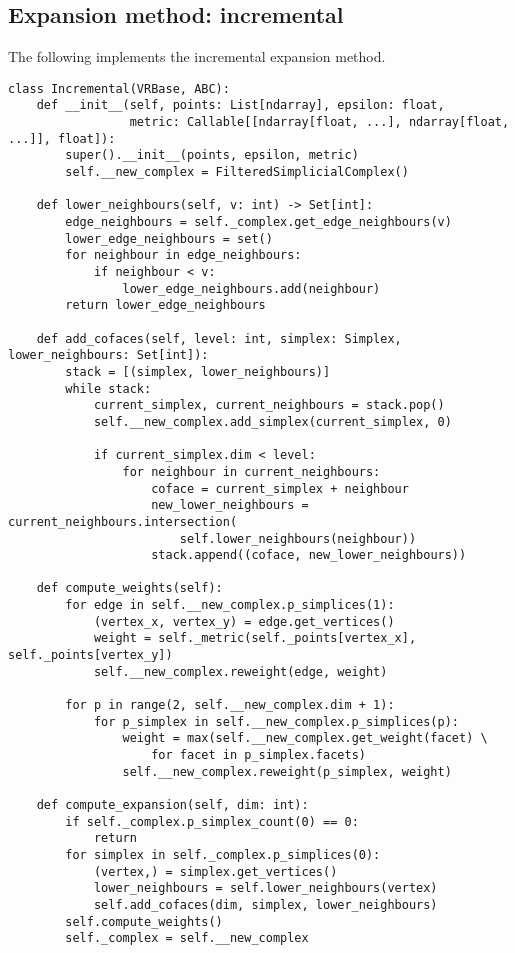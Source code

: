 \subsection{Expansion method: incremental}

The following implements the incremental expansion method.

\begin{verbatim}
class Incremental(VRBase, ABC):
    def __init__(self, points: List[ndarray], epsilon: float,
                 metric: Callable[[ndarray[float, ...], ndarray[float, ...]], float]):
        super().__init__(points, epsilon, metric)
        self.__new_complex = FilteredSimplicialComplex()

    def lower_neighbours(self, v: int) -> Set[int]:
        edge_neighbours = self._complex.get_edge_neighbours(v)
        lower_edge_neighbours = set()
        for neighbour in edge_neighbours:
            if neighbour < v:
                lower_edge_neighbours.add(neighbour)
        return lower_edge_neighbours

    def add_cofaces(self, level: int, simplex: Simplex, lower_neighbours: Set[int]):
        stack = [(simplex, lower_neighbours)]
        while stack:
            current_simplex, current_neighbours = stack.pop()
            self.__new_complex.add_simplex(current_simplex, 0)

            if current_simplex.dim < level:
                for neighbour in current_neighbours:
                    coface = current_simplex + neighbour
                    new_lower_neighbours = current_neighbours.intersection(
                        self.lower_neighbours(neighbour))
                    stack.append((coface, new_lower_neighbours))

    def compute_weights(self):
        for edge in self.__new_complex.p_simplices(1):
            (vertex_x, vertex_y) = edge.get_vertices()
            weight = self._metric(self._points[vertex_x], self._points[vertex_y])
            self.__new_complex.reweight(edge, weight)

        for p in range(2, self.__new_complex.dim + 1):
            for p_simplex in self.__new_complex.p_simplices(p):
                weight = max(self.__new_complex.get_weight(facet) \
                    for facet in p_simplex.facets)
                self.__new_complex.reweight(p_simplex, weight)

    def compute_expansion(self, dim: int):
        if self._complex.p_simplex_count(0) == 0:
            return
        for simplex in self._complex.p_simplices(0):
            (vertex,) = simplex.get_vertices()
            lower_neighbours = self.lower_neighbours(vertex)
            self.add_cofaces(dim, simplex, lower_neighbours)
        self.compute_weights()
        self._complex = self.__new_complex
\end{verbatim}

